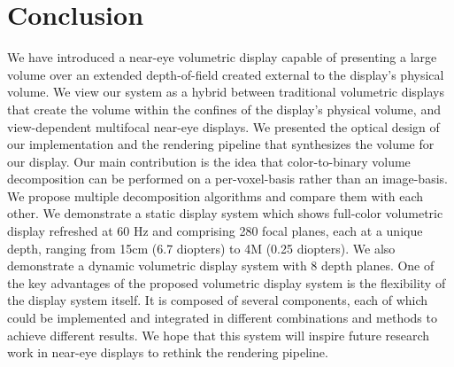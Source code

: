 \section{Conclusion}
We have introduced a near-eye volumetric display capable of presenting a large volume over an extended depth-of-field created external to the display's physical volume. We view our system as a hybrid between traditional volumetric displays that create the volume within the confines of the display's physical volume, and view-dependent multifocal near-eye displays. We presented the optical design of our implementation and the rendering pipeline that synthesizes the volume for our display. 
Our main contribution is the idea that color-to-binary volume decomposition can be performed on a per-voxel-basis rather than an image-basis. 
We propose multiple decomposition algorithms and compare them with each other. 
We demonstrate a static display system which shows full-color volumetric display refreshed at 60 Hz and comprising 280 focal planes, each at a unique depth, ranging from 15cm (6.7 diopters) to 4M (0.25 diopters). 
We also demonstrate a dynamic volumetric display system with 8 depth planes. 
One of the key advantages of the proposed volumetric display system is the flexibility of the display system itself. 
It is composed of several components, each of which could be implemented and integrated in different combinations and methods to achieve different results. 
We hope that this system will inspire future research work in near-eye displays to rethink the rendering pipeline. 

